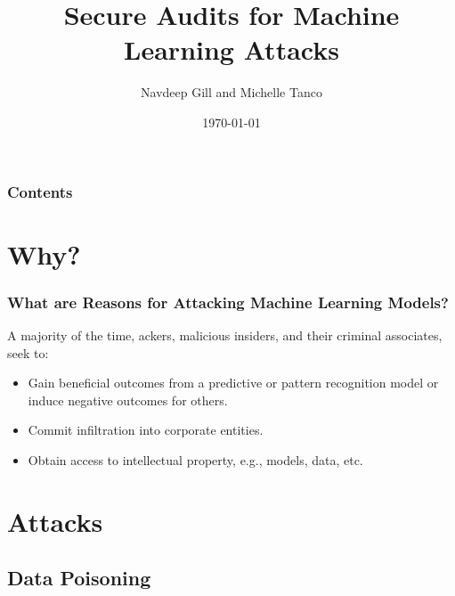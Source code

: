 \documentclass[11pt,
               aspectratio=169,
               hyperref={colorlinks}
               ]{beamer}
\author{\hspace{1pt}Navdeep Gill and Michelle Tanco}
\title{Secure Audits for Machine Learning Attacks}
\institute{\href{https://www.h2o.ai}{H\textsubscript{2}O.ai}}
\date{\today}
\begin{document}
	
	\maketitle
	
	\begin{frame}
	
		\frametitle{Contents}
		
		\tableofcontents{}
		
	\end{frame}

	\section{Why?}

	\begin{frame}
		
		\frametitle{What are Reasons for Attacking Machine Learning Models?}
A majority of the time, ackers, malicious insiders, and their criminal associates, seek to:
			\begin{itemize}
				\item Gain beneficial outcomes from a predictive or pattern recognition model or induce negative outcomes for others. %
				\item Commit infiltration into corporate entities.
				\item Obtain access to intellectual property, e.g., models, data, etc.
			\end{itemize}	
		\end{frame}

	\section{Attacks}

		\subsection{Data Poisoning}
\end{document}
